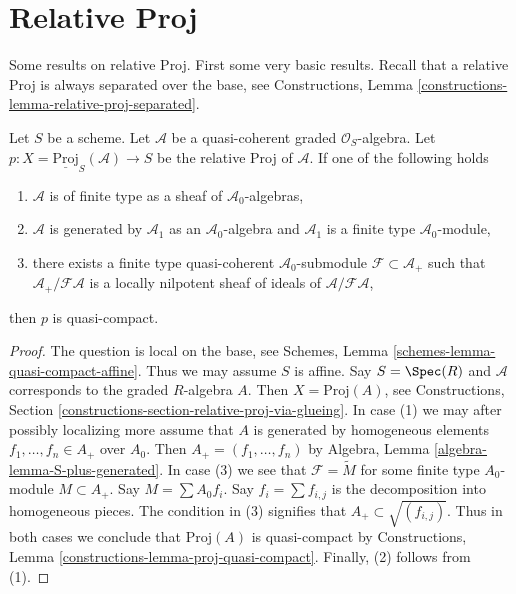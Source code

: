 \section{Relative Proj}
\label{section-relative-proj}

\noindent
Some results on relative Proj.
First some very basic results. Recall that a relative Proj is always
separated over the base, see
Constructions, Lemma \ref{constructions-lemma-relative-proj-separated}.

\begin{lemma}
\label{lemma-relative-proj-quasi-compact}
Let $S$ be a scheme. Let $\mathcal{A}$ be a quasi-coherent graded
$\mathcal{O}_S$-algebra. Let
$p : X = \underline{\text{Proj}}_S(\mathcal{A}) \to S$ be the relative
Proj of $\mathcal{A}$. If one of the following holds
\begin{enumerate}
\item $\mathcal{A}$ is of finite type as a sheaf of
$\mathcal{A}_0$-algebras,
\item $\mathcal{A}$ is generated by $\mathcal{A}_1$ as an
$\mathcal{A}_0$-algebra and $\mathcal{A}_1$ is a finite type
$\mathcal{A}_0$-module,
\item there exists a finite type quasi-coherent $\mathcal{A}_0$-submodule
$\mathcal{F} \subset \mathcal{A}_{+}$ such that
$\mathcal{A}_{+}/\mathcal{F}\mathcal{A}$ is a locally nilpotent
sheaf of ideals of $\mathcal{A}/\mathcal{F}\mathcal{A}$,
\end{enumerate}
then $p$ is quasi-compact.
\end{lemma}

\begin{proof}
The question is local on the base, see
Schemes, Lemma \ref{schemes-lemma-quasi-compact-affine}.
Thus we may assume $S$ is affine.
Say $S = \Spec(R)$ and $\mathcal{A}$ corresponds to the
graded $R$-algebra $A$. Then $X = \text{Proj}(A)$, see
Constructions, Section \ref{constructions-section-relative-proj-via-glueing}.
In case (1) we may after possibly localizing more
assume that $A$ is generated by homogeneous elements
$f_1, \ldots, f_n \in A_{+}$ over $A_0$. Then
$A_{+} = (f_1, \ldots, f_n)$ by
Algebra, Lemma \ref{algebra-lemma-S-plus-generated}.
In case (3) we see that $\mathcal{F} = \widetilde{M}$
for some finite type $A_0$-module $M \subset A_{+}$. Say
$M = \sum A_0f_i$. Say $f_i = \sum f_{i, j}$ is the decomposition
into homogeneous pieces. The condition in (3) signifies that
$A_{+} \subset \sqrt{(f_{i, j})}$. Thus in both cases we conclude that
$\text{Proj}(A)$ is quasi-compact by
Constructions, Lemma \ref{constructions-lemma-proj-quasi-compact}.
Finally, (2) follows from (1).
\end{proof}

